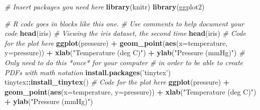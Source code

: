 \documentclass[]{article}
\newenvironment{Shaded}{\begin{snugshade}}{\end{snugshade}}
\newcommand{\KeywordTok}[1]{\textcolor[rgb]{0.13,0.29,0.53}{\textbf{#1}}}
\newcommand{\DataTypeTok}[1]{\textcolor[rgb]{0.13,0.29,0.53}{#1}}
\newcommand{\StringTok}[1]{\textcolor[rgb]{0.31,0.60,0.02}{#1}}
\newcommand{\CommentTok}[1]{\textcolor[rgb]{0.56,0.35,0.01}{\textit{#1}}}
\newcommand{\OperatorTok}[1]{\textcolor[rgb]{0.81,0.36,0.00}{\textbf{#1}}}
\newcommand{\NormalTok}[1]{#1}
\begin{document}
\begin{Shaded}
\begin{Highlighting}[]
\CommentTok{# Insert packages you need here}
\KeywordTok{library}\NormalTok{(knitr)}
\KeywordTok{library}\NormalTok{(ggplot2)}

\CommentTok{# R code goes in blocks like this one.}
\CommentTok{# Use comments to help document your code}
\KeywordTok{head}\NormalTok{(iris)}
\CommentTok{# Viewing the iris dataset, the second time}
\KeywordTok{head}\NormalTok{(iris)}
\CommentTok{# Code for the plot here}
\KeywordTok{ggplot}\NormalTok{(pressure) }\OperatorTok{+}\StringTok{ }
\StringTok{    }\KeywordTok{geom_point}\NormalTok{(}\KeywordTok{aes}\NormalTok{(}\DataTypeTok{x=}\NormalTok{temperature, }\DataTypeTok{y=}\NormalTok{pressure)) }\OperatorTok{+}
\StringTok{    }\KeywordTok{xlab}\NormalTok{(}\StringTok{"Temperature (deg C)"}\NormalTok{) }\OperatorTok{+}\StringTok{ }\KeywordTok{ylab}\NormalTok{(}\StringTok{"Pressure (mmHg)"}\NormalTok{)}
\CommentTok{# Only need to do this *once* for your computer}
\CommentTok{# in order to be able to create PDFs with math notation}
\KeywordTok{install.packages}\NormalTok{(}\StringTok{'tinytex'}\NormalTok{)}
\NormalTok{tinytex}\OperatorTok{::}\KeywordTok{install_tinytex}\NormalTok{()}
\CommentTok{# Code for the plot here}
\KeywordTok{ggplot}\NormalTok{(pressure) }\OperatorTok{+}\StringTok{ }
\StringTok{    }\KeywordTok{geom_point}\NormalTok{(}\KeywordTok{aes}\NormalTok{(}\DataTypeTok{x=}\NormalTok{temperature, }\DataTypeTok{y=}\NormalTok{pressure)) }\OperatorTok{+}
\StringTok{    }\KeywordTok{xlab}\NormalTok{(}\StringTok{"Temperature (deg C)"}\NormalTok{) }\OperatorTok{+}\StringTok{ }\KeywordTok{ylab}\NormalTok{(}\StringTok{"Pressure (mmHg)"}\NormalTok{)}
\end{Highlighting}
\end{Shaded}
\end{document}
